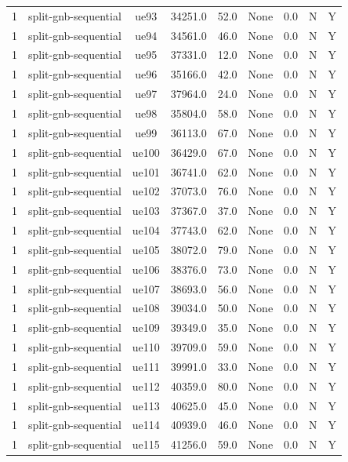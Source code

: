 \begin{table}[ht]
\begin{tabular}{|c|c|c|c|c|c|c|c|c|}
1 & split-gnb-sequential & ue93 & 34251.0 & 52.0 & None & 0.0 & N & Y \\
1 & split-gnb-sequential & ue94 & 34561.0 & 46.0 & None & 0.0 & N & Y \\
1 & split-gnb-sequential & ue95 & 37331.0 & 12.0 & None & 0.0 & N & Y \\
1 & split-gnb-sequential & ue96 & 35166.0 & 42.0 & None & 0.0 & N & Y \\
1 & split-gnb-sequential & ue97 & 37964.0 & 24.0 & None & 0.0 & N & Y \\
1 & split-gnb-sequential & ue98 & 35804.0 & 58.0 & None & 0.0 & N & Y \\
1 & split-gnb-sequential & ue99 & 36113.0 & 67.0 & None & 0.0 & N & Y \\
1 & split-gnb-sequential & ue100 & 36429.0 & 67.0 & None & 0.0 & N & Y \\
1 & split-gnb-sequential & ue101 & 36741.0 & 62.0 & None & 0.0 & N & Y \\
1 & split-gnb-sequential & ue102 & 37073.0 & 76.0 & None & 0.0 & N & Y \\
1 & split-gnb-sequential & ue103 & 37367.0 & 37.0 & None & 0.0 & N & Y \\
1 & split-gnb-sequential & ue104 & 37743.0 & 62.0 & None & 0.0 & N & Y \\
1 & split-gnb-sequential & ue105 & 38072.0 & 79.0 & None & 0.0 & N & Y \\
1 & split-gnb-sequential & ue106 & 38376.0 & 73.0 & None & 0.0 & N & Y \\
1 & split-gnb-sequential & ue107 & 38693.0 & 56.0 & None & 0.0 & N & Y \\
1 & split-gnb-sequential & ue108 & 39034.0 & 50.0 & None & 0.0 & N & Y \\
1 & split-gnb-sequential & ue109 & 39349.0 & 35.0 & None & 0.0 & N & Y \\
1 & split-gnb-sequential & ue110 & 39709.0 & 59.0 & None & 0.0 & N & Y \\
1 & split-gnb-sequential & ue111 & 39991.0 & 33.0 & None & 0.0 & N & Y \\
1 & split-gnb-sequential & ue112 & 40359.0 & 80.0 & None & 0.0 & N & Y \\
1 & split-gnb-sequential & ue113 & 40625.0 & 45.0 & None & 0.0 & N & Y \\
1 & split-gnb-sequential & ue114 & 40939.0 & 46.0 & None & 0.0 & N & Y \\
1 & split-gnb-sequential & ue115 & 41256.0 & 59.0 & None & 0.0 & N & Y \\

\end{tabular}
\end{table}
